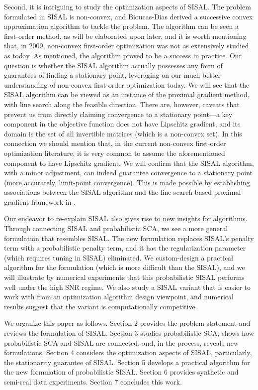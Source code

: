 \documentclass[10pt,twocolumn,twoside]{IEEEtran}
\begin{document}
Second, it is intriguing to study the optimization aspects of SISAL.
The problem formulated in SISAL is non-convex, and
Bioucas-Dias derived a successive convex approximation algorithm to tackle the problem.
The algorithm can be seen a first-order method, as will be elaborated upon later, and it is worth mentioning that, in 2009, non-convex first-order optimization was not as extensively studied as today.
As mentioned, the algorithm proved to be a success in practice.
Our question is whether the SISAL algorithm actually possesses any form of guarantees of finding a stationary point, leveraging on our much better understanding of non-convex first-order optimization today.
We will see that the SISAL algorithm can be viewed as an instance of the proximal gradient method, with line search along the feasible direction.
There are, however, caveats that prevent us from directly claiming convergence to a stationary point---a key component in the objective function does not have Lipschitz gradient, and its domain is the set of all invertible matrices (which is a non-convex set).
In this connection we should mention that, in the current non-convex first-order optimization literature, it is very common to assume the aforementioned component to have Lipschitz gradient.
We will confirm that the SISAL algorithm, with a minor adjustment, can indeed guarantee convergence to a stationary point (more accurately, limit-point convergence).
This is made possible by establishing associations between the SISAL algorithm and the line-search-based proximal gradient framework in \cite{BLPP16}.

Our endeavor to re-explain SISAL also gives rise to new insights for algorithms.
Through connecting SISAL and probabilistic SCA, we see a more general formulation that resembles SISAL.
The new formulation replaces SISAL's penalty term with a probabilistic penalty term, and it has the regularization parameter (which requires tuning in SISAL) eliminated.
We custom-design a practical algorithm for the formulation (which is more difficult than the SISAL), and we will illustrate by numerical experiments that this probabilistic SISAL performs well under the high SNR regime.
We also study a SISAL variant that is easier to work with from an optimization algorithm design viewpoint, and numerical results suggest that the variant is computationally competitive.

We organize this paper as follows.
Section 2 provides the problem statement and reviews the formulation of SISAL.
Section 3 studies probabilistic SCA, shows how probabilistic SCA and SISAL are connected, and, in the process, reveals new formulations.
Section 4 considers the optimization aspects of SISAL, particularly, the stationarity guarantee of SISAL.
Section 5 develops a practical algorithm for the new formulation of probabilistic SISAL.
Section 6 provides synthetic and semi-real data experiments.
Section 7 concludes this work.
\end{document}
